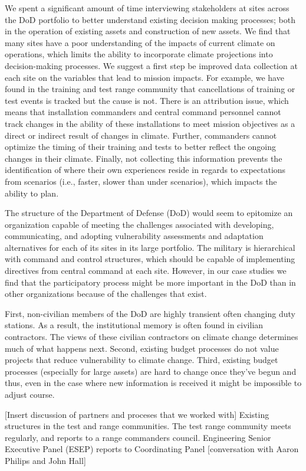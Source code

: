 \documentclass[10pt]{amsart}
\begin{document}
We spent a significant amount of time interviewing stakeholders at sites across the DoD portfolio to better understand existing decision making processes; both in the operation of existing assets and construction of new assets.
We find that many sites have a poor understanding of the impacts of current climate on operations, which limits the ability to incorporate climate projections into decision-making processes.
We suggest a first step be improved data collection at each site on the variables that lead to mission impacts.
For example, we have found in the training and test range community that cancellations of training or test events is tracked but the cause is not.
There is an attribution issue, which means that installation commanders and central command personnel cannot track changes in the ability of these installations to meet mission objectives as a direct or indirect result of changes in climate.
Further, commanders cannot optimize the timing of their training and tests to better reflect the ongoing changes in their climate. 
Finally, not collecting this information prevents the identification of where their own experiences reside in regards to expectations from scenarios (i.e., faster, slower than under scenarios), which impacts the ability to plan.

The structure of the Department of Defense (DoD) would seem to epitomize an organization capable of meeting the challenges associated with developing, communicating, and adopting vulnerability assessments and adaptation alternatives for each of its sites in its large portfolio.
The military is hierarchical with command and control structures, which should be capable of implementing directives from central command at each site. 
However, in our case studies we find that the participatory process might be more important in the DoD than in other organizations because of the challenges that exist.

First, non-civilian members of the DoD are highly transient often changing duty stations.
As a result, the institutional memory is often found in civilian contractors.
The views of these civilian contractors on climate change determines much of what happens next.
Second, existing budget processes do not value projects that reduce vulnerability to climate change.
Third, existing budget processes (especially for large assets) are hard to change once they've begun and thus, even in the case where new information is received it might be impossible to adjust course. 

[Insert discussion of partners and proceses that we worked with]
Existing structures in the test and range communities.
The test range community meets regularly, and reports to a range commanders council.
Engineering Senior Executive Panel (ESEP) reports to Coordinating Panel \parencite{}[conversation with Aaron Philips and John Hall]
\end{document}
